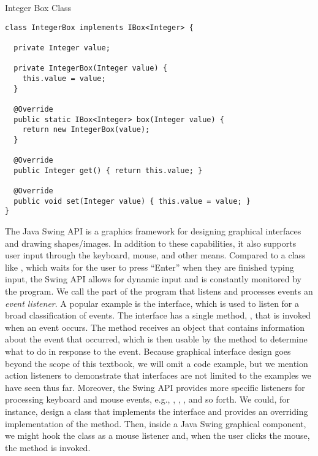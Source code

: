 \begin{cl}[]{Integer Box Class}
\begin{lstlisting}[language=MyJava]
class IntegerBox implements IBox<Integer> {
  
  private Integer value;
  
  private IntegerBox(Integer value) { 
    this.value = value; 
  }
  
  @Override
  public static IBox<Integer> box(Integer value) { 
    return new IntegerBox(value); 
  }
  
  @Override
  public Integer get() { return this.value; }
  
  @Override
  public void set(Integer value) { this.value = value; }
}
\end{lstlisting}
\end{cl}

The Java Swing API is a graphics framework for designing graphical interfaces and drawing shapes/images. In addition to these capabilities, it also supports user input through the keyboard, mouse, and other means. Compared to a class like , which waits for the user to press ``Enter'' when they are finished typing input, the Swing API allows for dynamic input and is constantly monitored by the program. We call the part of the program that listens and processes events an \textit{event listener}. A popular example is the  interface, which is used to listen for a broad classification of events. The  interface has a single method, , that is invoked when an event occurs. The  method receives an  object that contains information about the event that occurred, which is then usable by the method to determine what to do in response to the event. Because graphical interface design goes beyond the scope of this textbook, we will omit a code example, but we mention action listeners to demonstrate that interfaces are not limited to the examples we have seen thus far. Moreover, the Swing API provides more specific listeners for processing keyboard and mouse events, e.g., , , , and so forth. We could, for instance, design a class that implements the  interface and provides an overriding implementation of the  method. Then, inside a Java Swing graphical component, we might hook the class as a mouse listener and, when the user clicks the mouse, the  method is invoked.

